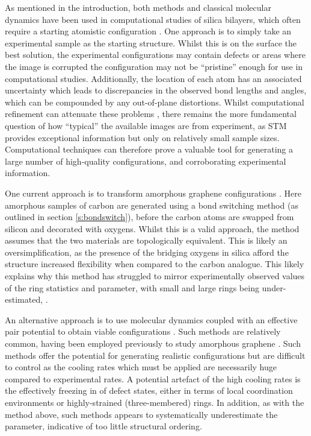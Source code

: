 As mentioned in the  introduction, both \abinitio{} methods and classical molecular dynamics have been used in computational studies of silica bilayers, which often require a starting atomistic configuration  \cite{Bjorkman2013,Malashevich2016,Wilson2013,Roy2018}.  
One approach is to simply take an experimental sample as the starting structure. 
Whilst this is on the surface the best solution, the experimental configurations may contain defects or areas where the image is corrupted \ie{} the configuration may not be ``pristine'' enough for use in computational studies.
Additionally, the location of each atom has an associated uncertainty which leads to discrepancies in the observed bond lengths and angles, which can be compounded by any out\--of\--plane distortions.
Whilst computational refinement can attenuate these problems \cite{Sadjadi2017,Wilson2018}, there remains the more fundamental question of how ``typical'' the available images are from experiment, as STM provides exceptional information but only on relatively small sample sizes.
Computational techniques can therefore prove a valuable tool for generating a large number of high\--quality configurations, and corroborating experimental information.  

One current approach is to transform amorphous graphene configurations \cite{Wilson2013}.
Here amorphous samples of carbon are generated using a bond switching method (as outlined in section \ref{s:bondswitch}), before the carbon atoms are swapped from silicon and decorated with oxygens.
Whilst this is a valid approach, the method assumes that the two materials are topologically equivalent.
This is likely an oversimplification, as the presence of the bridging oxygens in silica afford the structure increased flexibility when compared to the carbon analogue.
This likely explains why this method has struggled to mirror experimentally observed values of the ring statistics and \aw{} parameter, with small and large rings being under\--estimated,  \cite{Kumar2014}.

An alternative approach is to use molecular dynamics coupled with an effective pair potential to obtain viable configurations \cite{Roy2018}.
Such methods are relatively common, having been employed previously to study amorphous graphene \cite{Kumar2012}. 
Such methods offer the potential for generating realistic configurations but are difficult to control as the cooling rates which must be applied are necessarily huge compared to experimental rates. 
A potential artefact of the high cooling rates is the effectively freezing in of defect states, either in terms of local coordination environments or highly\--strained (three-membered) rings.
In addition, as with the method above, such methods appears to systematically underestimate the \aw{} parameter, indicative of too little structural ordering.

